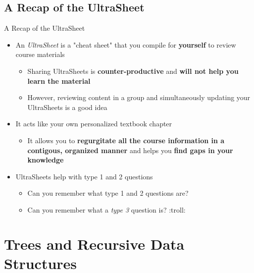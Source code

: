 \documentclass[hyperref={colorlinks,citecolor=blue,linkcolor=blue,urlcolor=blue}, aspectratio=1610]{beamer}
\begin{document}
\subsection{A Recap of the UltraSheet\texttrademark{}}
\begin{frame}{A Recap of the UltraSheet\texttrademark{}}
  \begin{itemize}
    \item An \textit{UltraSheet\texttrademark{}} is a "cheat sheet" that you compile for \textbf{yourself} to review course materials 
    \begin{itemize}
      \item Sharing UltraSheets\texttrademark{} is \textbf{counter-productive} and \textbf{will not help you learn the material}
      \item However, reviewing content in a group and simultaneously updating your UltraSheets\texttrademark{} is a good idea
    \end{itemize}
    \item It acts like your own personalized textbook chapter
    \begin{itemize}
      \item It allows you to \textbf{regurgitate all the course information in a contigous, organized manner} and helps you \textbf{find gaps in your knowledge}
    \end{itemize}
    \item UltraSheets\texttrademark{} help with type 1 and 2 questions 
    \begin{itemize}
      \item Can you remember what type 1 and 2 questions are?
      \item Can you remember what a \textit{type 3} question is? :troll:
    \end{itemize}
  \end{itemize}

\end{frame}

\section{Trees and Recursive Data Structures}
\end{document}
